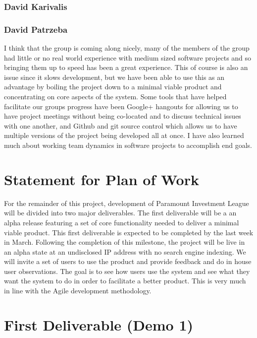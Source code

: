 \subsubsection{David Karivalis}

\subsubsection{David Patrzeba}
I think that the group is coming along nicely, many of the members of the group
had little or no real world experience with medium sized software projects and
so bringing them up to speed has been a great experience.  This of course is
also an issue since it slows development, but we have been able to use this as
an advantage by boiling the project down to a minimal viable product and
concentrating on core aspects of the system.  Some tools that have helped
facilitate our groups progress have been Google+ hangouts for allowing us to
have project meetings without being co-located and to discuss technical issues
with one another, and Github and git source control which allows us to have multiple
versions of the project being developed all at once.  I have also learned much
about working team dynamics in software projects to accomplish end goals.\\

\section{Statement for Plan of Work}
For the remainder of this project, development of Paramount Investment League
will be divided into two major deliverables. The first deliverable will be a
an alpha release featuring a set of core functionality needed to deliver a
minimal viable product. This first deliverable is expected to be completed by
the last week in March. Following the completion of this milestone, the project
will be live in an alpha state at an undisclosed IP address with no search engine
indexing.  We will invite a set of users to use the product and provide feedback
and do in house user observations.  The goal is to see how users use the system
and see what they want the system to do in order to facilitate a better product.
This is very much in line with the Agile development methodology.\\

\section{First Deliverable (Demo 1)}
